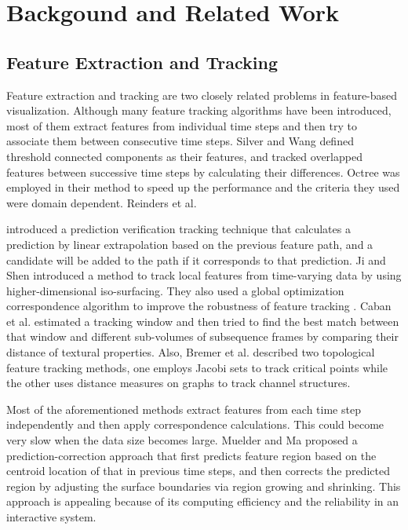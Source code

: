 \documentclass[10pt, conference, compsocconf]{IEEEtran}
\begin{document}

\section{Backgound and Related Work}

\subsection{Feature Extraction and Tracking}

Feature extraction and tracking are two closely related problems in feature-based visualization. Although many feature tracking algorithms have been introduced, most of them extract features from individual time steps and then try to associate them between consecutive time steps. Silver and Wang \cite{Silver1997} defined threshold connected components as their features, and tracked overlapped features between successive time steps by calculating their differences. Octree was employed in their method to speed up the performance and the criteria they used were domain dependent. Reinders et al. 

\cite{Reinders2001} introduced a prediction verification tracking technique that calculates a prediction by linear extrapolation based on the previous feature path, and a candidate will be added to the path if it corresponds to that prediction. Ji and Shen \cite{Ji2003} introduced a method to track local features from time-varying data by using higher-dimensional iso-surfacing. They also used a global optimization correspondence algorithm to improve the robustness of feature tracking \cite{Ji2006}. Caban et al. \cite{Caban2007} estimated a tracking window and then tried to find the best match between that window and different sub-volumes of subsequence frames by comparing their distance of textural properties. Also, Bremer et al. \cite{Bremer2007} described two topological feature tracking methods, one employs Jacobi sets to track critical points while the other uses distance measures on graphs to track channel structures.

Most of the aforementioned methods extract features from each time step independently and then apply correspondence calculations. This could become very slow when the data size becomes large. Muelder and Ma \cite{Muelder2009} proposed a prediction-correction approach that first predicts feature region based on the centroid location of that in previous time steps, and then corrects the predicted region by adjusting the surface boundaries via region growing and shrinking. This approach is appealing because of its computing efficiency and the reliability in an interactive system.
\end{document}
